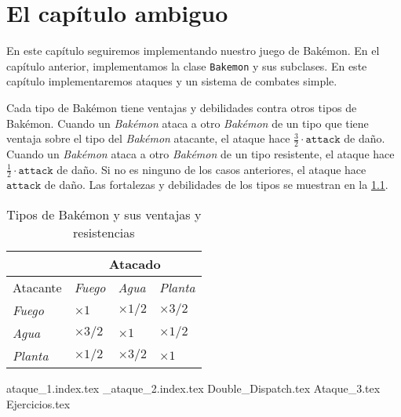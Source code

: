 \chapter{El capítulo ambiguo}
  \label{chap:ambiguo}
    
  En este capítulo seguiremos implementando nuestro juego de Bakémon.
  En el capítulo anterior, implementamos la clase \texttt{Bakemon} y sus subclases.
  En este capítulo implementaremos ataques y un sistema de combates simple.

  Cada tipo de Bakémon tiene ventajas y debilidades contra otros tipos de Bakémon.
  Cuando un \textit{Bakémon} ataca a otro \textit{Bakémon} de un tipo que tiene ventaja
  sobre el tipo del \textit{Bakémon} atacante, el ataque hace 
  \(\frac{3}{2} \cdot \mathtt{attack}\) de daño.
  Cuando un \textit{Bakémon} ataca a otro \textit{Bakémon} de un tipo resistente, el ataque
  hace \(\frac{1}{2} \cdot \mathtt{attack}\) de daño.
  Si no es ninguno de los casos anteriores, el ataque hace \(\mathtt{attack}\) de daño.
  Las fortalezas y debilidades de los tipos se muestran en la \cref{tab:tipos}.

  \begin{table}[ht!]
    \centering
    \begin{tabular}{ |p{2cm}|p{2cm}|p{2cm}|p{2cm}|  }
      \hline
                & \multicolumn{3}{|c|}{Atacado} \\
      \hline
      Atacante  & \textit{Fuego}              & \textit{Agua}           & \textit{Planta} \\
      \hline
      \textit{Fuego}  & \(\times 1\)           & \(\times 1/2\)         & \(\times 3/2\) \\
      \hline
      \textit{Agua}   & \(\times 3/2\)         & \(\times 1\)           & \(\times 1/2\) \\
      \hline
      \textit{Planta} & \(\times 1/2\)         & \(\times 3/2\)         & \(\times 1\) \\
      \hline
      \end{tabular}
    \caption{Tipos de Bakémon y sus ventajas y resistencias}
    \label{tab:tipos}
  \end{table}

  {ataque_1.index.tex}
  {_ataque_2.index.tex}
  {Double_Dispatch.tex}
  {Ataque_3.tex}
  {Ejercicios.tex}
  \printbibliography[keyword=double-dispatch]